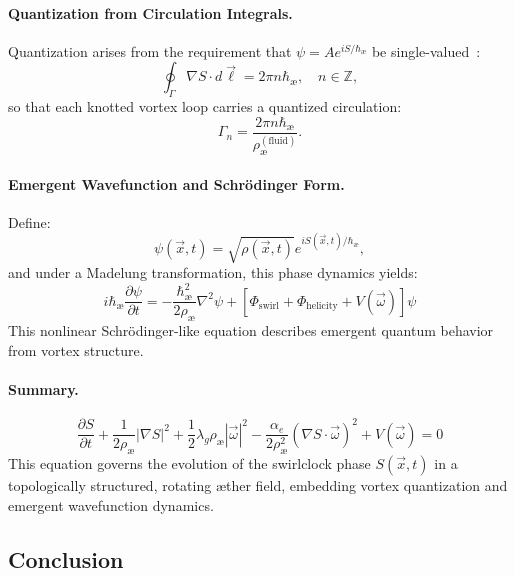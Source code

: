\paragraph{Quantization from Circulation Integrals.}
Quantization arises from the requirement that \( \psi = A e^{i S/\hbar_\text{\ae}} \) be single-valued~\cite{helmholtz1858integrals, faddeev1997stable}:
\begin{equation}
\oint_\Gamma \nabla S \cdot d\vec{\ell} = 2\pi n \hbar_\text{\ae}, \quad n \in \mathbb{Z},
\end{equation}
so that each knotted vortex loop carries a quantized circulation:
\begin{equation}
\Gamma_n = \frac{2\pi n \hbar_\text{\ae}}{\rho_\text{\ae}^{(\text{fluid})}}.
\end{equation}

\paragraph{Emergent Wavefunction and Schrödinger Form.}
Define:
\begin{equation}
\psi(\vec{x}, t) = \sqrt{\rho(\vec{x}, t)} e^{i S(\vec{x}, t)/\hbar_\text{\ae}},
\end{equation}
and under a Madelung transformation, this phase dynamics yields:
\begin{equation}
\boxed{
i \hbar_\text{\ae} \frac{\partial \psi}{\partial t} = -\frac{\hbar_\text{\ae}^2}{2 \rho_\text{\ae}} \nabla^2 \psi + \left[\Phi_\text{swirl} + \Phi_\text{helicity} + V(\vec{\omega})\right] \psi
}
\end{equation}
This nonlinear Schrödinger-like equation describes emergent quantum behavior from vortex structure.

\paragraph{Summary.}
\begin{equation}
\boxed{
\frac{\partial S}{\partial t} + \frac{1}{2 \rho_\text{\ae}} |\nabla S|^2 + \frac{1}{2} \lambda_g \rho_\text{\ae} |\vec{\omega}|^2 - \frac{\alpha_e}{2 \rho_\text{\ae}^2} (\nabla S \cdot \vec{\omega})^2 + V(\vec{\omega}) = 0
}
\end{equation}
This equation governs the evolution of the swirlclock phase \( S(\vec{x}, t) \) in a topologically structured, rotating \ae ther field, embedding vortex quantization and emergent wavefunction dynamics.

\subsection*{Conclusion}

